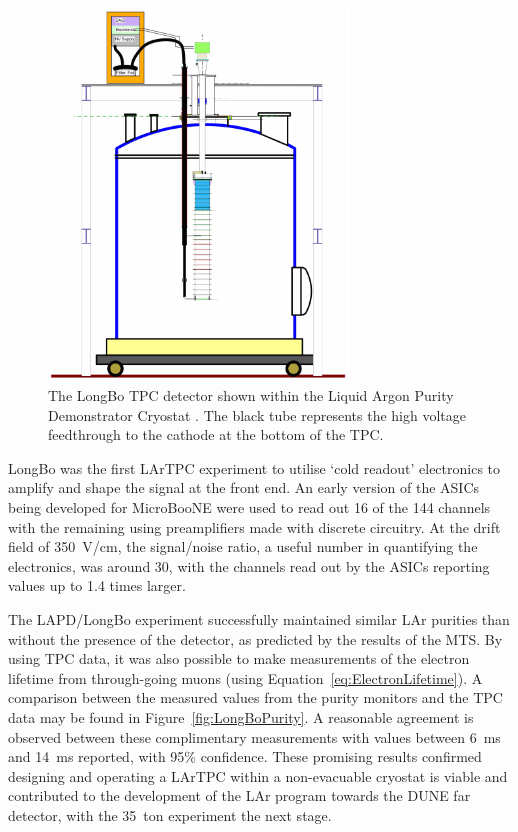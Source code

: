\begin{figure}
  \centering
  \includegraphics[width=8cm]{LongBo.pdf}
  \caption[The LongBo TPC detector shown within the Liquid Argon Purity Demonstrator Cryostat.]{The LongBo TPC detector shown within the Liquid Argon Purity Demonstrator Cryostat \cite{LongBo2015}.  The black tube represents the high voltage feedthrough to the cathode at the bottom of the TPC.}
  \label{fig:LongBo}
\end{figure}

LongBo was the first LArTPC experiment to utilise `cold readout' electronics to amplify and shape the signal at the front end.  An early version of the ASICs being developed for MicroBooNE were used to read out 16 of the 144 channels with the remaining using preamplifiers made with discrete circuitry.  At the drift field of 350~V/cm, the signal/noise ratio, a useful number in quantifying the electronics, was around 30, with the channels read out by the ASICs reporting values up to 1.4 times larger.

The LAPD/LongBo experiment successfully maintained similar LAr purities than without the presence of the detector, as predicted by the results of the MTS.  By using TPC data, it was also possible to make measurements of the electron lifetime from through-going muons (using Equation~\ref{eq:ElectronLifetime}).  A comparison between the measured values from the purity monitors and the TPC data may be found in Figure~\ref{fig:LongBoPurity}.  A reasonable agreement is observed between these complimentary measurements with values between 6~ms and 14~ms reported, with 95\% confidence.  These promising results confirmed designing and operating a LArTPC within a non-evacuable cryostat is viable and contributed to the development of the LAr program towards the DUNE far detector, with the 35~ton experiment the next stage.

